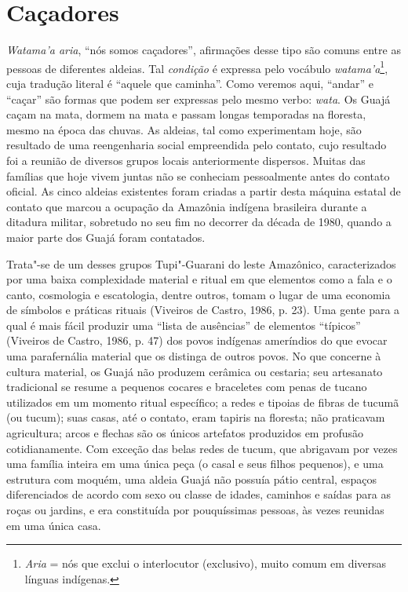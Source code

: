 \section{Caçadores}

\emph{Watama'a aria}, ``nós somos caçadores'', afirmações desse tipo são
comuns entre as pessoas de diferentes aldeias. Tal \emph{condição} é
expressa pelo vocábulo \emph{watama'a}\footnote{\emph{Aria} = nós que
  exclui o interlocutor (exclusivo), muito comum em diversas línguas
  indígenas.}, cuja tradução literal é ``aquele que caminha''. Como
veremos aqui, ``andar'' e ``caçar'' são formas que podem ser expressas pelo
mesmo verbo: \emph{wata}. Os Guajá caçam na mata, dormem na mata e
passam longas temporadas na floresta, mesmo na época das chuvas. As
aldeias, tal como experimentam hoje, são resultado de uma reengenharia
social empreendida pelo contato, cujo resultado foi a reunião de
diversos grupos locais anteriormente dispersos. Muitas das famílias que
hoje vivem juntas não se conheciam pessoalmente antes do contato
oficial. As cinco aldeias existentes foram criadas a partir desta
máquina estatal de contato que marcou a ocupação da Amazônia indígena
brasileira durante a ditadura militar, sobretudo no seu fim no decorrer
da década de 1980, quando a maior parte dos Guajá foram contatados.

Trata"-se de um desses grupos Tupi"-Guarani do leste Amazônico,
caracterizados por uma baixa complexidade material e ritual em que
elementos como a fala e o canto, cosmologia e escatologia, dentre
outros, tomam o lugar de uma economia de símbolos e práticas rituais
(Viveiros de Castro, 1986, p. 23). Uma gente para a qual é mais fácil
produzir uma ``lista de ausências'' de elementos ``típicos'' (Viveiros
de Castro, 1986, p. 47) dos povos indígenas ameríndios do que evocar uma
parafernália material que os distinga de outros povos. No que concerne à
cultura material, os Guajá não produzem cerâmica ou cestaria; seu
artesanato tradicional se resume a pequenos cocares e braceletes com
penas de tucano utilizados em um momento ritual específico; a redes e
tipoias de fibras de tucumã (ou tucum); suas casas, até o contato, eram
tapiris na floresta; não praticavam agricultura; arcos e flechas são os
únicos artefatos produzidos em profusão cotidianamente. Com exceção das
belas redes de tucum, que abrigavam por vezes uma família inteira em uma
única peça (o casal e seus filhos pequenos), e uma estrutura com moquém,
uma aldeia Guajá não possuía pátio central, espaços diferenciados de
acordo com sexo ou classe de idades, caminhos e saídas para as roças ou
jardins, e era constituída por pouquíssimas pessoas, às vezes reunidas
em uma única casa.

